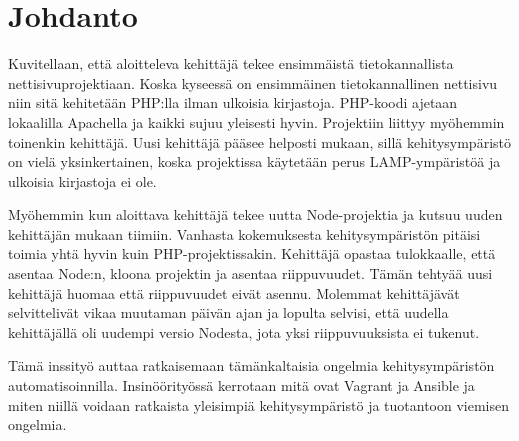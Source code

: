 \chapter{Johdanto}

Kuvitellaan, että aloitteleva kehittäjä tekee ensimmäistä tietokannallista nettisivuprojektiaan. Koska kyseessä on ensimmäinen tietokannallinen nettisivu niin sitä kehitetään PHP:lla ilman ulkoisia kirjastoja. PHP-koodi ajetaan lokaalilla Apachella ja kaikki sujuu yleisesti hyvin. Projektiin liittyy myöhemmin toinenkin kehittäjä. Uusi kehittäjä pääsee helposti mukaan, sillä kehitysympäristö on vielä yksinkertainen, koska projektissa käytetään perus LAMP-ympäristöä ja ulkoisia kirjastoja ei ole.

Myöhemmin kun aloittava kehittäjä tekee uutta Node-projektia ja kutsuu uuden kehittäjän mukaan tiimiin. Vanhasta kokemuksesta kehitysympäristön pitäisi toimia yhtä hyvin kuin PHP-projektissakin. Kehittäjä opastaa tulokkaalle, että asentaa Node:n, kloona projektin ja asentaa riippuvuudet. Tämän tehtyää uusi kehittäjä huomaa että riippuvuudet eivät asennu. Molemmat kehittäjävät selvittelivät vikaa muutaman päivän ajan ja lopulta selvisi, että uudella kehittäjällä oli uudempi versio Nodesta, jota yksi riippuvuuksista ei tukenut.

Tämä inssityö auttaa ratkaisemaan tämänkaltaisia ongelmia kehitysympäristön automatisoinnilla. Insinöörityössä kerrotaan mitä ovat Vagrant ja Ansible ja miten niillä voidaan ratkaista yleisimpiä kehitysympäristö ja tuotantoon viemisen ongelmia.
